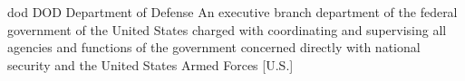 \newglsXgovernment%
{dod}%
{DOD}%
{Department of Defense}%
{An executive branch department of the federal government of the United States charged with coordinating and supervising all agencies and functions of the government concerned directly with national security and the United States Armed Forces \cite{website:Department_of_Defense}}%
[U.S.]%